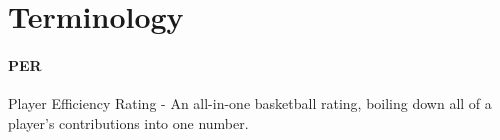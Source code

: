 \documentclass{sigchi}
\begin{document}
%
%
%
%
%
\balance{}

%
\printbibliography

\appendix
\section{Terminology}\label{sec:terminology}

\paragraph{PER} Player Efficiency Rating - An all-in-one basketball rating,
boiling down all of a player's contributions into one number\cite{per}.
\end{document}
